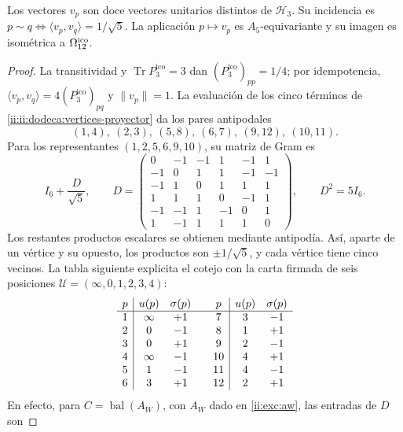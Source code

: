 \begin{proposition}
\label{ii:ii:dodeca:realizacion}
Los vectores \(v_p\) son doce vectores unitarios distintos de
\(\mathcal H_3\). Su incidencia es
\(p\sim q\Longleftrightarrow\langle v_p,v_q\rangle=1/\sqrt5\).
La aplicación \(p\mapsto v_p\) es \(A_5\)-equivariante y su imagen
es isométrica a \(\Omega_{12}^{\rm ico}\).
\end{proposition}
\begin{proof}
La transitividad y \(\operatorname{Tr}P_3^{\mathrm{ico}}=3\) dan
\((P_3^{\mathrm{ico}})_{pp}=1/4\); por idempotencia,
\(\langle v_p,v_q\rangle=4(P_3^{\mathrm{ico}})_{pq}\) y \(\|v_p\|=1\).
La evaluación de los cinco términos de
\eqref{ii:ii:dodeca:vertices-proyector} da los pares antipodales
\[
 (1,4),\ (2,3),\ (5,8),\ (6,7),\ (9,12),\ (10,11).
\]
Para los representantes \((1,2,5,6,9,10)\), su matriz de Gram es
\begin{equation}
 I_6+\frac D{\sqrt5},\qquad
 D=\begin{pmatrix}
 0&-1&-1&1&-1&1\\
 -1&0&1&1&-1&-1\\
 -1&1&0&1&1&1\\
 1&1&1&0&-1&1\\
 -1&-1&1&-1&0&1\\
 1&-1&1&1&1&0
 \end{pmatrix},\qquad D^2=5I_6.
 \label{ii:ii:dodeca:gram}
\end{equation}
Los restantes productos escalares se obtienen mediante antipodía.
Así, aparte de un vértice y su opuesto, los productos son
\(\pm1/\sqrt5\), y cada vértice tiene cinco vecinos. La tabla siguiente
explicita el cotejo con la carta firmada de seis posiciones
\(\mathcal U=(\infty,0,1,2,3,4)\):
\begin{equation}
\begin{array}{c|cc@{\qquad}c|cc}
p&u(p)&\sigma(p)&p&u(p)&\sigma(p)\\ \hline
1&\infty&+1&7&3&-1\\
2&0&-1&8&1&+1\\
3&0&+1&9&2&-1\\
4&\infty&-1&10&4&+1\\
5&1&-1&11&4&-1\\
6&3&+1&12&2&+1
\end{array}
\label{ii:ii:dodeca:carta-firmada}
\end{equation}
En efecto, para \(C=\operatorname{bal}(A_W)\), con \(A_W\) dado en
\eqref{ii:exc:aw}, las entradas de \(D\) son

\end{proof}
